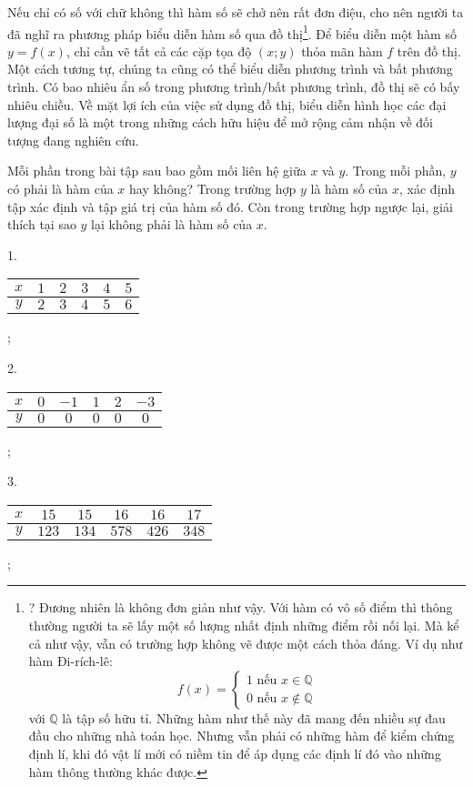 Nếu chỉ có số với chữ không thì hàm số sẽ chở nên rất đơn điệu, cho nên người ta đã nghĩ ra phương pháp biểu diễn hàm số qua đồ thị\footnote{? Đương nhiên là không đơn giản như vậy. Với hàm có vô số điểm thì thông thường người ta sẽ lấy một số lượng nhất định những điểm rồi nối lại. Mà kể cả như vậy, vẫn có trường hợp không vẽ được một cách thỏa đáng. Ví dụ như hàm Đi-rích-lê: $$f(x) =
\begin{cases}
   1 \text{ nếu } x\in \mathbb{Q} \\
   0 \text{ nếu } x\notin \mathbb{Q}
\end{cases}$$ với $\mathbb{Q}$ là tập số hữu tỉ. Những hàm như thế này đã mang đến nhiều sự đau đầu cho những nhà toán học. Nhưng vẫn phải có những hàm  để kiểm chứng định lí, khi đó vật lí mới có niềm tin để áp dụng các định lí đó vào những hàm thông thường khác được.}. Để biểu diễn một hàm số $y=f(x)$, chỉ cần vẽ tất cả các cặp tọa độ $(x; y)$ thỏa mãn hàm $f$ trên đồ thị. Một cách tương tự, chúng ta cũng có thể biểu diễn phương trình và bất phương trình. Có bao nhiêu ẩn số trong phương trình/bất phương trình, đồ thị sẽ có bấy nhiêu chiều. Về mặt lợi ích của việc sử dụng đồ thị, biểu diễn hình học các đại lượng đại số là một trong những cách hữu hiệu để mở rộng cảm nhận về đối tượng đang nghiên cứu. 
      
\exercise Mỗi phần trong bài tập sau bao gồm mối liên hệ giữa $x$ và $y$. Trong mỗi phần, $y$ có phải là hàm của $x$ hay không? Trong trường hợp $y$ là hàm số của $x$, xác định tập xác định và tập giá trị của hàm số đó. Còn trong trường hợp ngược lại, giải thích tại sao $y$ lại không phải là hàm số của $x$.

1.
\begin{tabular}{|c|c|c|c|c|c|}
   \hline
   $x$ & $1$ & $2$ & $3$ & $4$ & $5$ \\
   \hline
   $y$ & $2$ & $3$ & $4$ & $5$ & $6$ \\
   \hline
\end{tabular};

2.
\begin{tabular}{|c|c|c|c|c|c|}
   \hline
   $x$ & $0$ & $-1$ & $1$ & $2$ & $-3$ \\
   \hline
   $y$ & $0$ & $0$ & $0$ & $0$ & $0$ \\
   \hline
\end{tabular};

3.
\begin{tabular}{|c|c|c|c|c|c|}
   \hline
   $x$ & $15$ & $15$ & $16$ & $16$ & $17$ \\
   \hline
   $y$ & $123$ & $134$ & $578$ & $426$ & $348$ \\
   \hline
\end{tabular};

